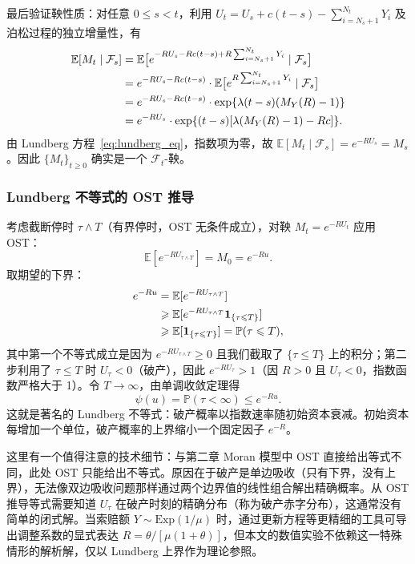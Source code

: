 最后验证鞅性质：对任意 $0 \leqslant s < t$，利用 $U_t = U_s + c(t-s) - \sum_{i=N_s+1}^{N_t} Y_i$ 及泊松过程的独立增量性，有
\begin{align}
  \mathbb{E}[M_t \mid \mathcal{F}_s]
  &= \mathbb{E}\big[e^{-R U_s - R c(t-s) + R \sum_{i=N_s+1}^{N_t} Y_i} \mid \mathcal{F}_s\big] \notag\\
  &= e^{-R U_s - R c(t-s)} \cdot \mathbb{E}\big[e^{R \sum_{i=N_s+1}^{N_t} Y_i} \mid \mathcal{F}_s\big] \notag\\
  &= e^{-R U_s - R c(t-s)} \cdot \exp\{\lambda(t-s)(M_Y(R) - 1)\} \notag\\
  &= e^{-R U_s} \cdot \exp\{(t-s)[\lambda(M_Y(R) - 1) - R c]\}.
\end{align}
由 Lundberg 方程~\eqref{eq:lundberg_eq}，指数项为零，故 $\mathbb{E}[M_t \mid \mathcal{F}_s] = e^{-R U_s} = M_s$。因此 $\{M_t\}_{t \geqslant 0}$ 确实是一个 $\mathcal{F}_t$-鞅。

\subsubsection{Lundberg 不等式的 OST 推导}

考虑截断停时 $\tau \wedge T$（有界停时，OST 无条件成立），对鞅 $M_t = e^{-R U_t}$ 应用 OST：
\begin{equation}
  \mathbb{E}[e^{-R U_{\tau \wedge T}}] = M_0 = e^{-R u}.
\end{equation}
取期望的下界：
\begin{align}
  e^{-R u} &= \mathbb{E}[e^{-R U_{\tau \wedge T}}] \notag\\
  &\geqslant \mathbb{E}[e^{-R U_{\tau \wedge T}} \mathbf{1}_{\{\tau \leqslant T\}}] \notag\\
  &\geqslant \mathbb{E}[\mathbf{1}_{\{\tau \leqslant T\}}] = \mathbb{P}(\tau \leqslant T),
\end{align}
其中第一个不等式成立是因为 $e^{-R U_{\tau \wedge T}} \geqslant 0$ 且我们截取了 $\{\tau \leqslant T\}$ 上的积分；第二步利用了 $\tau \leqslant T$ 时 $U_\tau < 0$（破产），因此 $e^{-R U_\tau} > 1$（因 $R > 0$ 且 $U_\tau < 0$，指数函数严格大于 1）。令 $T \to \infty$，由单调收敛定理得
\begin{equation}\label{eq:lundberg}
  \psi(u) = \mathbb{P}(\tau < \infty) \leqslant e^{-R u}.
\end{equation}
这就是著名的 Lundberg 不等式\cite{gerber1979introduction,asmussen2010ruin}：破产概率以指数速率随初始资本衰减。初始资本每增加一个单位，破产概率的上界缩小一个固定因子 $e^{-R}$。

这里有一个值得注意的技术细节：与第二章 Moran 模型中 OST 直接给出等式不同，此处 OST 只能给出不等式。原因在于破产是单边吸收（只有下界，没有上界），无法像双边吸收问题那样通过两个边界值的线性组合解出精确概率。从 OST 推导等式需要知道 $U_\tau$ 在破产时刻的精确分布（称为破产赤字分布），这通常没有简单的闭式解。当索赔额 $Y \sim \text{Exp}(1/\mu)$ 时，通过更新方程等更精细的工具可导出调整系数的显式表达 $R = \theta/[\mu(1+\theta)]$，但本文的数值实验不依赖这一特殊情形的解析解，仅以 Lundberg 上界作为理论参照。

